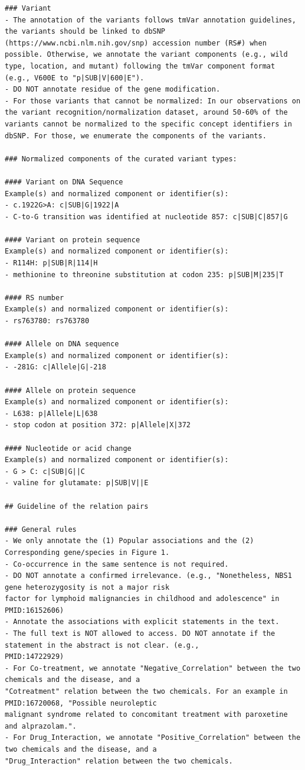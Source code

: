 \begin{lstlisting}
### Variant
- The annotation of the variants follows tmVar annotation guidelines, the variants should be linked to dbSNP (https://www.ncbi.nlm.nih.gov/snp) accession number (RS#) when possible. Otherwise, we annotate the variant components (e.g., wild type, location, and mutant) following the tmVar component format (e.g., V600E to "p|SUB|V|600|E").
- DO NOT annotate residue of the gene modification.
- For those variants that cannot be normalized: In our observations on the variant recognition/normalization dataset, around 50-60% of the variants cannot be normalized to the specific concept identifiers in dbSNP. For those, we enumerate the components of the variants.

### Normalized components of the curated variant types:

#### Variant on DNA Sequence
Example(s) and normalized component or identifier(s):
- c.1922G>A: c|SUB|G|1922|A
- C-to-G transition was identified at nucleotide 857: c|SUB|C|857|G

#### Variant on protein sequence
Example(s) and normalized component or identifier(s):
- R114H: p|SUB|R|114|H
- methionine to threonine substitution at codon 235: p|SUB|M|235|T

#### RS number
Example(s) and normalized component or identifier(s):
- rs763780: rs763780

#### Allele on DNA sequence
Example(s) and normalized component or identifier(s):
- -281G: c|Allele|G|-218

#### Allele on protein sequence
Example(s) and normalized component or identifier(s):
- L638: p|Allele|L|638
- stop codon at position 372: p|Allele|X|372

#### Nucleotide or acid change
Example(s) and normalized component or identifier(s):
- G > C: c|SUB|G||C
- valine for glutamate: p|SUB|V||E

## Guideline of the relation pairs

### General rules
- We only annotate the (1) Popular associations and the (2) Corresponding gene/species in Figure 1.
- Co-occurrence in the same sentence is not required.
- DO NOT annotate a confirmed irrelevance. (e.g., "Nonetheless, NBS1 gene heterozygosity is not a major risk
factor for lymphoid malignancies in childhood and adolescence" in PMID:16152606)
- Annotate the associations with explicit statements in the text.
- The full text is NOT allowed to access. DO NOT annotate if the statement in the abstract is not clear. (e.g.,
PMID:14722929)
- For Co-treatment, we annotate "Negative_Correlation" between the two chemicals and the disease, and a
"Cotreatment" relation between the two chemicals. For an example in PMID:16720068, "Possible neuroleptic
malignant syndrome related to concomitant treatment with paroxetine and alprazolam.".
- For Drug_Interaction, we annotate "Positive_Correlation" between the two chemicals and the disease, and a
"Drug_Interaction" relation between the two chemicals.


\end{lstlisting}
